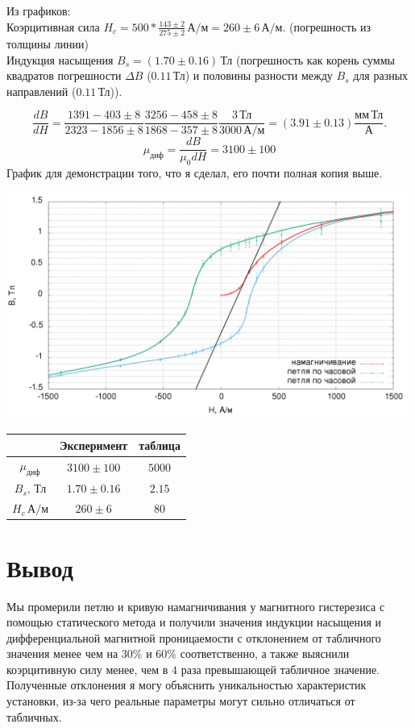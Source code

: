 \documentclass[a4paper]{article}
\begin{document}
\begin{enumerate}
Из графиков:\\
Коэрцитивная сила $H_{c}=500*\frac{143\pm2}{275\pm2}\,\text{А}/\text{м} = 260\pm6\,\text{А}/\text{м}.$ (погрешность из толщины линии)\\
Индукция насыщения $B_s = (1.70\pm0.16)\,\text{Тл}$ (погрешность как корень суммы квадратов погрешности $\Delta B$ ($0.11\,\text{Тл}$) и половины разности между $B_s$ для разных направлений ($0.11\,\text{Тл}$)).

$$\frac{dB}{dH} = \frac{1391-403\pm8}{2323-1856\pm8}\frac{3256-458\pm8}{1868-357\pm8}\frac{3\,\text{Тл}}{3000\,\text{А}/\text{м}} = (3.91\pm0.13) \frac{\text{мм}\,\text{Тл}}{\text{А}}.$$
$$\mu_\text{диф} = \frac{dB}{\mu_0dH} = 3100\pm100$$
График для демонстрации того, что я сделал, его почти полная копия выше.
\begin{center}
\includegraphics[width=0.99\textwidth]{6_res.png}
\end{center}

\end{enumerate}

\begin{center}
\begin{tabular}{|c|c|c|}
\hline
&Эксперимент&таблица\\\hline
$\mu_\text{диф}$&$3100\pm100$&$5000$\\\hline
$B_s,\,\text{Тл}$&$1.70\pm0.16$&$2.15$\\\hline
$H_{c}\,\text{А}/\text{м}$&$260\pm6$&$80$\\\hline
\end{tabular}
\end{center}
\section{Вывод}
Мы промерили петлю и кривую намагничивания у магнитного гистерезиса с помощью статического метода и получили значения индукции насыщения и дифференциальной магнитной проницаемости с отклонением от табличного значения менее чем на $30\%$ и $60\%$ соответственно, а также выяснили коэрцитивную силу менее, чем в $4$ раза превышающей табличное значение. Полученные отклонения я могу объяснить уникальностью характеристик установки, из-за чего реальные параметры могут сильно отличаться от табличных.
\end{document}
